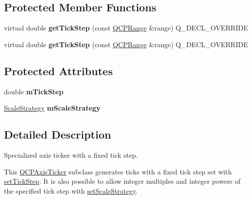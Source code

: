 \subsection*{Protected Member Functions}
\begin{DoxyCompactItemize}
\item 
\mbox{\label{class_q_c_p_axis_ticker_fixed_a9e99da01ab92a86aed415eef32fed13a}} 
virtual double {\bfseries get\+Tick\+Step} (const \hyperlink{class_q_c_p_range}{Q\+C\+P\+Range} \&range) Q\+\_\+\+D\+E\+C\+L\+\_\+\+O\+V\+E\+R\+R\+I\+DE
\item 
\mbox{\label{class_q_c_p_axis_ticker_fixed_ada7d04195eafb15398dbfa1ed163e64f}} 
virtual double {\bfseries get\+Tick\+Step} (const \hyperlink{class_q_c_p_range}{Q\+C\+P\+Range} \&range) Q\+\_\+\+D\+E\+C\+L\+\_\+\+O\+V\+E\+R\+R\+I\+DE
\end{DoxyCompactItemize}
\subsection*{Protected Attributes}
\begin{DoxyCompactItemize}
\item 
\mbox{\label{class_q_c_p_axis_ticker_fixed_a4aeef2d3eaa57ec56f422ab1f82175d2}} 
double {\bfseries m\+Tick\+Step}
\item 
\mbox{\label{class_q_c_p_axis_ticker_fixed_a61ead1590161769b0d36e09419e67b10}} 
\hyperlink{class_q_c_p_axis_ticker_fixed_a15b3d38b935d404b1311eb85cfb6a439}{Scale\+Strategy} {\bfseries m\+Scale\+Strategy}
\end{DoxyCompactItemize}


\subsection{Detailed Description}
Specialized axis ticker with a fixed tick step. 



This \hyperlink{class_q_c_p_axis_ticker}{Q\+C\+P\+Axis\+Ticker} subclass generates ticks with a fixed tick step set with \hyperlink{class_q_c_p_axis_ticker_fixed_a4bc83d85a4f81d4abdd3fa5042d7b833}{set\+Tick\+Step}. It is also possible to allow integer multiples and integer powers of the specified tick step with \hyperlink{class_q_c_p_axis_ticker_fixed_acbc7c9bcd80b3dc3edee5f0519d301f6}{set\+Scale\+Strategy}.

